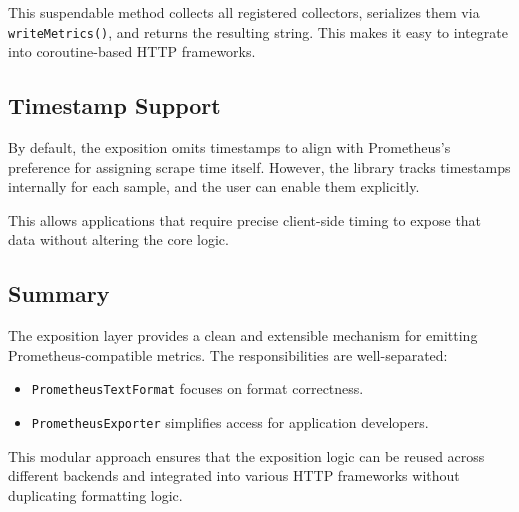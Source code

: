 This suspendable method collects all registered collectors, serializes them via \texttt{writeMetrics()}, and returns the resulting string.
This makes it easy to integrate into coroutine-based HTTP frameworks.

\subsection{Timestamp Support}\label{subsec:timestamp-support}

By default, the exposition omits timestamps to align with Prometheus's preference for assigning scrape time itself.
However, the library tracks timestamps internally for each sample, and the user can enable them explicitly.

This allows applications that require precise client-side timing to expose that data without altering the core logic.

\subsection{Summary}\label{subsec:summary}

The exposition layer provides a clean and extensible mechanism for emitting Prometheus-compatible metrics.
The responsibilities are well-separated:

\begin{itemize}
    \item \texttt{PrometheusTextFormat} focuses on format correctness.
    \item \texttt{PrometheusExporter} simplifies access for application developers.
\end{itemize}

This modular approach ensures that the exposition logic can be reused across different backends and integrated into various HTTP frameworks without duplicating formatting logic.

